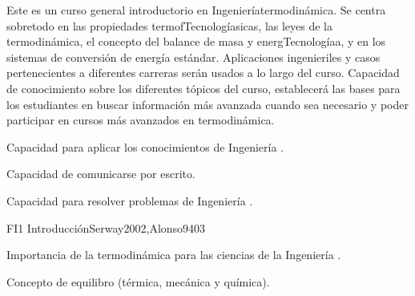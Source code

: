 \begin{syllabus}


\begin{justification}
Este es un curso general introductorio en Ingenieríatermodinámica. 
Se centra sobretodo en las propiedades termofTecnologíasicas, las leyes de la termodinámica, 
el concepto del balance de masa y energTecnologíaa, y en los sistemas de conversión de energía estándar.
Aplicaciones ingenieriles y casos pertenecientes a diferentes carreras serán usados a lo largo del curso.
Capacidad de conocimiento sobre los diferentes tópicos del curso, establecerá las bases para los estudiantes
en buscar información más avanzada cuando sea necesario y poder participar en cursos más avanzados en termodinámica.

% 

\end{justification}

\begin{goals}
\item Capacidad para aplicar los conocimientos de Ingeniería .
\item Capacidad de comunicarse por escrito.
\item Capacidad para resolver problemas de Ingeniería .


\end{goals}

\begin{outcomes}
\end{outcomes}

\begin{unit}{FI1 Introducción}{Serway2002,Alonso94}{0}{3}
\begin{topics}
      \item Importancia de la termodinámica para las ciencias de la Ingeniería .
      \item Concepto de equilibro (térmica, mecánica y química).
      

\end{topics}
\end{unit}
\end{syllabus}
